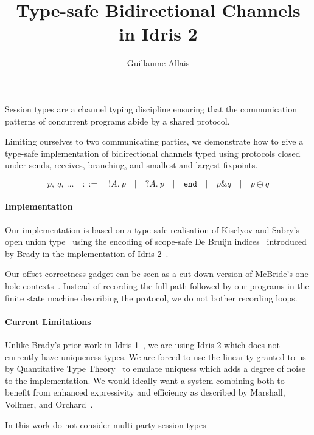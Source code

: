 \documentclass{easychair}
\title{Type-safe Bidirectional Channels in Idris 2}
\author{Guillaume Allais\inst{1}}
\institute{
  University of Strathclyde,
  Glasgow, Scotland, United Kingdom\\
  \email{guillaume.allais@strath.ac.uk}}
\begin{document}
\maketitle


Session types are a channel typing discipline ensuring that the communication
patterns of concurrent programs abide by a shared protocol.

Limiting ourselves to two communicating parties, we demonstrate how to give a
type-safe implementation of bidirectional channels typed using protocols closed
under sends, receives, branching, and smallest and largest fixpoints.

\newcommand{\send}[2]{!#1.~#2}
\newcommand{\recv}[2]{?#1.~#2}
\newcommand{\select}[2]{#1 \mathop{\oplus} #2}
\newcommand{\offer}[2]{#1 \mathop{\&} #2}

\[
p,~ q,~ \dots
  \quad ::= \quad \send{A}{p}
  \quad | \quad \recv{A}{p}
  \quad | \quad \mathtt{end}
  \quad | \quad \offer{p}{q}
  \quad | \quad \select{p}{q}
\]


\paragraph{Implementation}
Our implementation is based on a type safe realisation of
Kiselyov and Sabry's open union type~\cite{DBLP:conf/haskell/KiselyovSS13}
using the encoding of scope-safe
De Bruijn indices~\cite{MANUAL:journals/math/debruijn72}
introduced by Brady in the implementation of
Idris 2~\cite{DBLP:conf/ecoop/Brady21}.

Our offset correctness gadget can be seen as a cut down version of
McBride's one hole contexts~\cite{DBLP:conf/popl/McBride08}. Instead
of recording the full path followed by our programs in the finite
state machine describing the protocol, we do not bother recording
loops.


\paragraph{Current Limitations}

Unlike Brady's prior work in Idris 1~\cite{DBLP:journals/aghcs/Brady17},
we are using Idris 2 which does not currently have uniqueness types.
We are forced to use the linearity granted to us by
Quantitative Type Theory~\cite{DBLP:conf/birthday/McBride16,DBLP:conf/lics/Atkey18}
to emulate uniquess which adds a degree of noise to the implementation.
We would ideally want a system combining both to benefit from enhanced
expressivity and efficiency as described by Marshall, Vollmer,
and Orchard~\cite{DBLP:conf/esop/MarshallVO22}.

In this work do not consider multi-party session types



%
%
%

\end{document}
